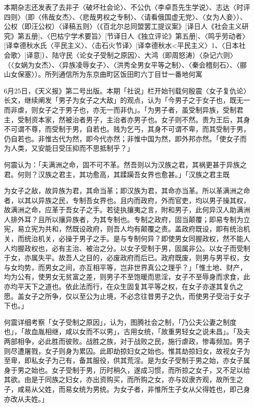本期杂志还发表了去非子〈破坏社会论〉、不公仇〈李卓吾先生学说〉、志达〈时评四则〉（即〈伟哉女杰〉、〈悲哉男权之专制〉、〈请看俄国虚无党〉、〈女为人妾〉）、公权（即汪公权）〈译稿五则〉（《百北尔总同盟罢工提议案》[译日人《社会主义研究》第五册]、〈巴枯宁学术要旨〉[节译日人《独立评论》第五册]、〈鸣乎劳动者〉[译幸德秋水氏〈平民主义〉、〈击石火节译〉[译幸德秋水<平民主义〉1、〈日本社会歌〉[译意]）、陆守民〈论女子受制之原因〉、大鸿（即周怒涛）〈杂记六则〉（〈女娲为女杰〉、〈异族凌辱女子〉、〈洪秀全男女平等之制〉、〈秦会稽刻石〉、〈郦山女保塞〉）。所列通信所为东京曲町区饭田町六丁目廿一番地何寓

6月25日，《天义报》第二号出版。本期「社说」栏开始刊载何殷震〈女子复仇论〉长文，继续阐发「男子为女子之大敌」的观点，认为「今男子之于女子也，既无一而非虐，则女子之于男子也，亦无一而非仇」。「为男子者，虽受制异族，受制君主，受制资本家，然被治者男子，主治者亦男子也。女子则不然。贵为王后，其身不可谓不尊，而受制于男，自若也。贱为乞丐，其身不可谓不卑，而其受制于男，仍自若也。非惟古代为然，即今代亦然；非惟中国为然，即外邦亦然。「使女子而为人类，又安能日受压抑而不思抵制乎？」

何震认为：「夫满洲之命，固不可不革。然吾则以为汉族之君，其祸更甚于异族之君。何则？汉族之君主，其功愈高，其蹂躏吾女界也愈甚。」「汉族之君主既


\noindent 为女子之敌，故异族为君，其命当革；即汉族为君，其命亦当革。所以革满洲之命者，以其以异族之民，专制吾女界也。且内而政府，外而官吏，均以男子操其权，故满洲之命，应革于吾女子之手。若徒执攘夷之言，附和男子，此何异汉人助满洲人排外耳？且所以攘异族者，为其专制也。专制之政府，固当颠覆；即易专制为立宪，易立宪为共和，然既设政府，则吾人均有颠覆之责。盖政府既设，即有统治机关，而统治机关，必操于男子之手。是与专制何异？即使男女同握政权，然不能人人均握政权也，必有主治、被治之分。以女子受制于男，固属非公。以女子而受制于女，亦属失平。故吾人之目的，必废政府而后已。政府既废，则男与男平权，女与女均势，而男女之间，亦互相平等，岂非世界真公之理乎？」「惟土地、财产，均为公有，使男女无贫富之差，则男子不至饱暖而思淫，女子不至辱身而求食，此亦均平天下之道也。依此法而行，在众生固复其平等之权，在女子亦遂其复仇之愿。盖女子之所争，仅以至公为止境，不必念往昔男子之仇，而使男子受治于女子下也。」

何震详细考察「女子受制之原因」，认为，图腾社会之制，「乃公夫公妻之制度也」，「故血胤相继，咸以女而不以男」，古用女统，「故重男轻女之说未昌」。「及夫两部相争，必此胜而彼败。战胜之族，对于战败之民，施行虐政，惨毒频加。男子则尽遭屠戮，女子则身为累囚。此即劫掠妇女之始也。惟其劫掠妇女，故视女子为至卑，即私女子为己有，备其服役，供其荒淫。是为女子受制于男之始，亦女子属身于男之始也。女子受制于男，历时稍久，遂成习惯，而所掠之女子，又不足以给其欲。由是于同族之妇女，亦出资购买，而所购之女，亦与奴隶齐观，故所生之子，咸易从父姓，而易女统为男统。为女子者，非惟所生子女从父得姓也，即己身亦改从夫姓。」

